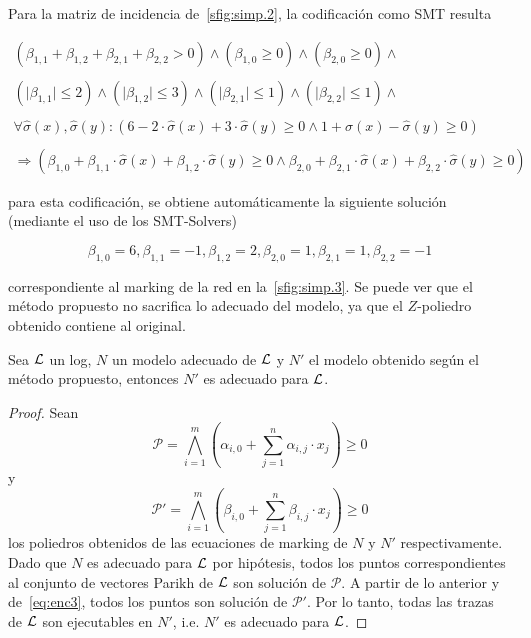 \begin{example}
Para la matriz de incidencia de~\autoref{sfig:simp.2}, la codificación como SMT resulta

$$\begin{array}{l}
{(\beta_{1,1} + \beta_{1,2} + \beta_{2,1} + \beta_{2,2} > 0)} \land
{(\beta_{1,0} \geq 0)} \land
{(\beta_{2,0} \geq 0)} \land \\ \\
{(\lvert \beta_{1,1} \rvert \leq 2)} \land
{(\lvert \beta_{1,2} \rvert \leq 3)} \land
{(\lvert \beta_{2,1} \rvert \leq 1)} \land
{(\lvert \beta_{2,2} \rvert \leq 1)} \land \\ \\
{\forall \widehat\sigma(x), \widehat\sigma(y) : (6 - 2 \cdot \widehat\sigma(x) + 3 \cdot \widehat\sigma(y) \ge 0 \land 1 + \widehat\sigma(x) - \widehat\sigma(y) \ge 0)} \\ \\
\Rightarrow (\beta_{1,0} + \beta_{1,1} \cdot \widehat\sigma(x) + \beta_{1,2 }\cdot  \widehat\sigma(y) \ge 0 \land \beta_{2,0} + \beta_{2,1} \cdot \widehat\sigma(x) + \beta_{2,2} \cdot  \widehat\sigma(y) \ge 0)
\end{array}$$

para esta codificación, se obtiene automáticamente la siguiente solución (mediante el uso de los SMT-Solvers)

$$\beta_{1,0}=6,\beta_{1,1}=-1,\beta_{1,2}=2, \beta_{2,0}=1,\beta_{2,1}=1,\beta_{2,2}=-1$$

correspondiente al marking de la red en la~\autoref{sfig:simp.3}.
Se puede ver que el método propuesto no sacrifica lo adecuado del modelo, ya que el $Z$-poliedro obtenido
contiene al original.
\end{example}

\begin{theorem}
    \label{theo:fit}
    Sea ${\mathcal L}$ un log, $N$ un modelo adecuado de ${\mathcal L}$ y $N'$ el modelo obtenido según el método propuesto,
    entonces $N'$ es adecuado para ${\mathcal L}$.
\end{theorem}

\begin{proof}
    Sean $$\mathcal{P} = \bigwedge\limits_{i=1}^m (\alpha_{i,0} + \sum\limits_{j=1}^n \alpha_{i,j} \cdot x_j )\ge 0$$ y
    $$\mathcal{P}' = \bigwedge\limits_{i=1}^m (\beta_{i,0} + \sum\limits_{j=1}^n \beta_{i,j} \cdot x_j )\ge 0$$ los poliedros
    obtenidos de las ecuaciones de marking de $N$ y $N'$ respectivamente. Dado que $N$ es adecuado para ${\mathcal L}$ por hipótesis, 
    todos los puntos correspondientes al conjunto de vectores Parikh de ${\mathcal L}$ son solución de $\mathcal{P}$.
    A partir de lo anterior y de~\eqref{eq:enc3}, todos los puntos son solución de $\mathcal{P}'$.
    Por lo tanto, todas las trazas de ${\mathcal L}$ son ejecutables en $N'$, i.e. $N'$ es adecuado para ${\mathcal L}$.
\end{proof}

